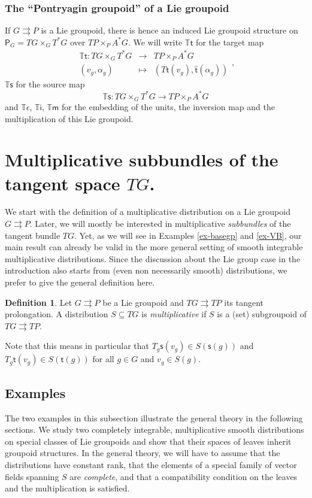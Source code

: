\documentclass{amsart}
\theoremstyle{definition}
\newtheorem{definition}[theorem]{Definition}
\begin{document}
\subsubsection*{\textbf{The ``Pontryagin groupoid'' of a Lie groupoid}}
If $G{{\rightrightarrows}} P$ is a Lie groupoid, there is hence 
an induced Lie groupoid structure on $\mathsf P_G=TG\times_G T^*G$
over $TP\times_P A^*G$. 
We will write ${{\mathbb{T}}}{{\mathsf{t}}}$ for the target map
\[\begin{array}{ccc}
{{\mathbb{T}}}{{\mathsf{t}}}:TG\times_G T^*G&\to& TP\times_P A^*G\\
(v_g,\alpha_g)&\mapsto&\left(T{{\mathsf{t}}}(v_g),\hat{{\mathsf{t}}}(\alpha_g)\right)
\end{array},
\]
${{\mathbb{T}}}{{\mathsf{s}}}$ for the source map
\[
{{\mathbb{T}}}{{\mathsf{s}}}:TG\times_G T^*G\to TP\times_P A^*G
\]
and ${{\mathbb{T}}}\epsilon$, ${{\mathbb{T}}}\mathsf i$, ${{\mathbb{T}}}\mathsf {{\mathsf{m}}}$ for the 
embedding of the units, the inversion map and the multiplication of this Lie groupoid.

\section{Multiplicative subbundles of the tangent space $TG$.}
We start with the definition of a multiplicative distribution on a Lie groupoid $G{{\rightrightarrows}} P$. Later, we will
mostly be interested in multiplicative \emph{subbundles} of the tangent bundle $TG$. Yet, as we will see 
in  Examples \ref{ex-basegp}
and \ref{ex-VB}, our main result can already be valid 
 in the more general setting 
of smooth integrable multiplicative distributions.
Since the discussion about the Lie group case in the introduction
also starts from (even non necessarily smooth) distributions,
we prefer to give the general definition here.

\begin{definition}
Let $G\rightrightarrows P$ be a Lie groupoid and $TG{{\rightrightarrows}} TP$ its tangent prolongation.
A distribution $S\subseteq TG$ is \emph{multiplicative} if
$S$ is a (set) subgroupoid of $TG{{\rightrightarrows}} TP$.  
\end{definition}
Note that this means in particular that $T_g{{\mathsf{s}}}(v_g)\in S({{\mathsf{s}}}(g))$ and 
$T_g{{\mathsf{t}}}(v_g)\in S({{\mathsf{t}}}(g))$ for all $g\in G$ and $v_g\in S(g)$.

\subsection{Examples}
The two examples in this subsection illustrate the general theory in the following
sections. We study two completely integrable, multiplicative smooth distributions on special
classes of Lie groupoids 
and show that their  spaces of leaves inherit groupoid structures.
In the general theory, we will have to assume that the distributions have constant rank, 
that the elements of  a special  family of vector fields spanning $S$ are \emph{complete}, and that 
a compatibility condition on the leaves and the multiplication is satisfied.
\end{document}
